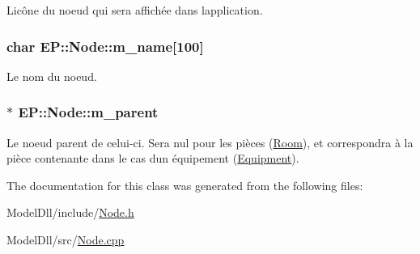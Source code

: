 L\textquotesingle{}icône du noeud qui sera affichée dans l\textquotesingle{}application. 

\subsubsection[{\texorpdfstring{m\+\_\+name}{m_name}}]{\setlength{\rightskip}{0pt plus 5cm}char E\+P\+::\+Node\+::m\+\_\+name\mbox{[}100\mbox{]}\hspace{0.3cm}{\ttfamily [protected]}}\hypertarget{class_e_p_1_1_node_a31312ed65b64cb081b4cbdf0acffa44f}{}\label{class_e_p_1_1_node_a31312ed65b64cb081b4cbdf0acffa44f}


Le nom du noeud. 

\subsubsection[{\texorpdfstring{m\+\_\+parent}{m_parent}}]{$\ast$ E\+P\+::\+Node\+::m\+\_\+parent\hspace{0.3cm}{\ttfamily [protected]}}\hypertarget{class_e_p_1_1_node_ac61ce03b473134cb3cd4fcf33acc03f6}{}\label{class_e_p_1_1_node_ac61ce03b473134cb3cd4fcf33acc03f6}


Le noeud parent de celui-\/ci. Sera nul pour les pièces (\hyperlink{class_e_p_1_1_room}{Room}), et correspondra à la pièce contenante dans le cas d\textquotesingle{}un équipement (\hyperlink{class_e_p_1_1_equipment}{Equipment}). 



The documentation for this class was generated from the following files\+:\begin{DoxyCompactItemize}
\item 
Model\+Dll/include/\hyperlink{_node_8h}{Node.\+h}\item 
Model\+Dll/src/\hyperlink{_node_8cpp}{Node.\+cpp}\end{DoxyCompactItemize}
